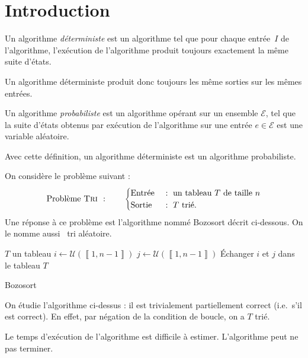 \section{Introduction}

\begin{defn}
	Un algorithme {\it déterministe}\/ est un algorithme tel que pour chaque entrée~$I$\/ de l'algorithme, l'exécution de l'algorithme produit toujours exactement la même suite d'états.
\end{defn}

\begin{rmk}
	Un algorithme déterministe produit donc toujours les même sorties sur les mêmes entrées.
\end{rmk}

\begin{defn}
	Un algorithme {\it probabiliste}\/ est un algorithme opérant sur un ensemble $\mathcal{E}$, tel que la suite d'états obtenus par exécution de l'algorithme sur une entrée $e \in \mathcal{E}$\/ est une variable aléatoire.
\end{defn}

\begin{rmk}
	Avec cette définition, un algorithme déterministe est un algorithme probabiliste.
\end{rmk}

\begin{exm}
	On considère le problème suivant : \[
		\text{Problème {\sc Tri }}:\qquad \begin{cases}
			\text{Entrée } &: \text{ un tableau } T \text{ de taille } n\\
			\text{Sortie } &:\ T \text{ trié}.
		\end{cases}
	\]
	Une réponse à ce problème est l'algorithme nommé {\sc Bozosort}\/ décrit ci-dessous. On le nomme aussi \guillemotleft~tri aléatoire.~\guillemotright
	\begin{algorithm}[H]
		\centering
		\begin{algorithmic}[1]
			\Entree $T$\/ un tableau
				\State $i \gets \mathcal{U}(\left\llbracket 1,n-1 \right\rrbracket)$
				\State $j \gets \mathcal{U}(\left\llbracket 1,n-1 \right\rrbracket)$
				\State Échanger $i$\/ et $j$\/ dans le tableau $T$\/
			\EndWhile
		\end{algorithmic}
		\caption{{\sc Bozosort}}
	\end{algorithm}
	On étudie l'algorithme ci-dessus : il est trivialement partiellement correct (i.e.\ s'il est correct). En effet, par négation de la condition de boucle, on a $T$\/ trié.

	Le temps d'exécution de l'algorithme est difficile à estimer. L'algorithme peut ne pas terminer.
\end{exm}

